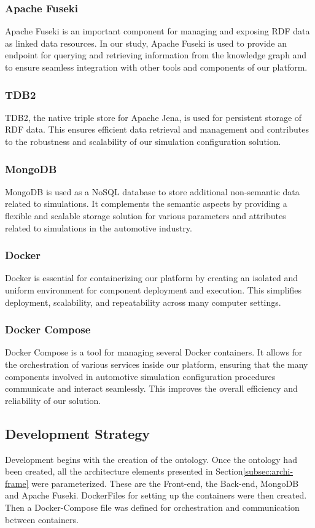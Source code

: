     \subsubsection{Apache Fuseki}
    Apache Fuseki is an important component for managing and exposing RDF data as linked data resources. In our study, Apache Fuseki is used to provide an endpoint for querying and retrieving information from the knowledge graph and to ensure seamless integration with other tools and components of our platform.

    
    \subsubsection{TDB2}
    TDB2, the native triple store for Apache Jena, is used for persistent storage of RDF data. This ensures efficient data retrieval and management and contributes to the robustness and scalability of our simulation configuration solution.
    
    
    \subsubsection{MongoDB}
    MongoDB is used as a NoSQL database to store additional non-semantic data related to simulations. It complements the semantic aspects by providing a flexible and scalable storage solution for various parameters and attributes related to simulations in the automotive industry.
    
    \subsubsection{Docker}
    Docker is essential for containerizing our platform by creating an isolated and uniform environment for component deployment and execution. This simplifies deployment, scalability, and repeatability across many computer settings.
    
    \subsubsection{Docker Compose}
    Docker Compose is a tool for managing several Docker containers. It allows for the orchestration of various services inside our platform, ensuring that the many components involved in automotive simulation configuration procedures communicate and interact seamlessly. This improves the overall efficiency and reliability of our solution.

    
\subsection{Development Strategy}
Development begins with the creation of the ontology. Once the ontology had been created, all the architecture elements presented in Section\ref{subsec:archi-frame} were parameterized. These are the Front-end, the Back-end, MongoDB and Apache Fuseki. DockerFiles for setting up the containers were then created. Then a Docker-Compose file was defined for orchestration and communication between containers.\\

